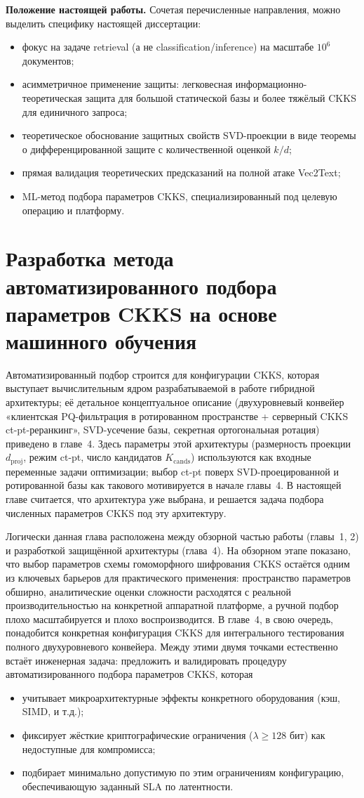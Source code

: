 \documentclass[a4paper, 12pt, oneside, openany]{article}
\newcounter{chap}
\newcommand{\chapsection}[1]{%
  \refstepcounter{chap}%
  \setcounter{equation}{0}%
  \setcounter{table}{0}%
  \setcounter{figure}{0}%
  \section{#1}%
}
\begin{document}
\textbf{Положение настоящей работы.} Сочетая перечисленные направления, можно выделить специфику настоящей диссертации:
\begin{itemize}
	\item фокус на задаче retrieval (а не classification/inference) на масштабе $10^{6}$ документов;
	\item асимметричное применение защиты: легковесная информационно-теоретическая защита для большой статической базы и более тяжёлый CKKS для единичного запроса;
	\item теоретическое обоснование защитных свойств SVD-проекции в виде теоремы о дифференцированной защите с количественной оценкой $k/d$;
	\item прямая валидация теоретических предсказаний на полной атаке Vec2Text;
	\item ML-метод подбора параметров CKKS, специализированный под целевую операцию и платформу.
\end{itemize}


\chapsection{Разработка метода автоматизированного подбора параметров CKKS на основе машинного обучения}

 Автоматизированный подбор строится для конфигурации CKKS, которая выступает вычислительным ядром разрабатываемой в работе гибридной архитектуры; её детальное концептуальное описание (двухуровневый конвейер «клиентская PQ-фильтрация в ротированном пространстве + серверный CKKS ct-pt-реранкинг», SVD-усечение базы, секретная ортогональная ротация) приведено в главе~4. Здесь параметры этой архитектуры (размерность проекции $d_{\mathrm{proj}}$, режим ct-pt, число кандидатов $K_{\mathrm{cands}}$) используются как входные переменные задачи оптимизации; выбор ct-pt поверх SVD-проецированной и ротированной базы как такового мотивируется в начале главы~4. В настоящей главе считается, что архитектура уже выбрана, и решается задача подбора численных параметров CKKS под эту архитектуру.

Логически данная глава расположена между обзорной частью работы (главы~1, 2) и разработкой защищённой архитектуры (глава~4). На обзорном этапе показано, что выбор параметров схемы гомоморфного шифрования CKKS остаётся одним из ключевых барьеров для практического применения: пространство параметров обширно, аналитические оценки сложности расходятся с реальной производительностью на конкретной аппаратной платформе, а ручной подбор плохо масштабируется и плохо воспроизводится. В главе~4, в свою очередь, понадобится конкретная конфигурация CKKS для интегрального тестирования полного двухуровневого конвейера. Между этими двумя точками естественно встаёт инженерная задача: предложить и валидировать процедуру автоматизированного подбора параметров CKKS, которая
\begin{itemize}
	\item учитывает микроархитектурные эффекты конкретного оборудования (кэш, SIMD, и т.д.);
	\item фиксирует жёсткие криптографические ограничения ($\lambda \geq 128$ бит) как недоступные для компромисса;
	\item подбирает минимально допустимую по этим ограничениям конфигурацию, обеспечивающую заданный SLA по латентности.
\end{itemize}
\end{document}
